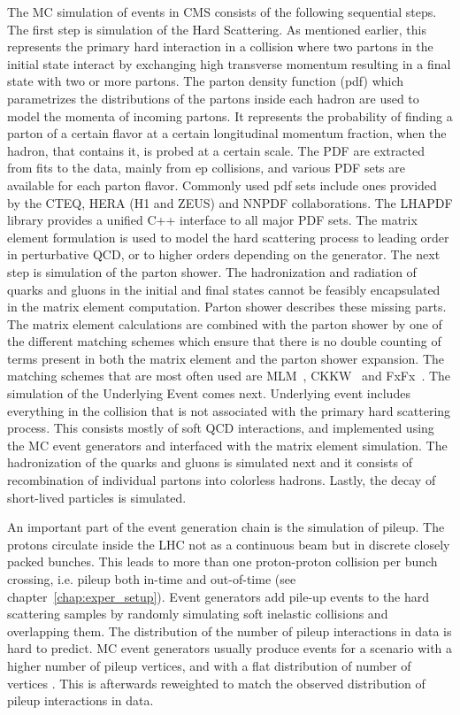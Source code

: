 The MC simulation of events in CMS consists of the following sequential steps. The first step is simulation of the Hard Scattering. As mentioned earlier, this represents the primary hard interaction in a collision where two partons in the initial state interact by exchanging high transverse momentum resulting in a final state with two or more partons. The parton density function (pdf) which parametrizes the distributions of the partons inside each hadron are used to model the momenta of incoming partons. It represents the probability of finding a parton of a certain flavor at a certain longitudinal momentum fraction, when the hadron, that contains it, is probed at a certain scale. The PDF are extracted from fits to the data, mainly from ep collisions, and various PDF sets are available for each parton flavor. Commonly used pdf sets include ones provided by the  CTEQ, HERA (H1 and ZEUS) and NNPDF collaborations. The LHAPDF library provides a unified C++ interface to all major PDF sets. The matrix element formulation is used to model the hard scattering process to leading order in perturbative QCD, or to higher orders depending on the generator. The next step is simulation of the parton shower. The hadronization and radiation of quarks and gluons in the initial and final states cannot be feasibly encapsulated in the matrix element computation. Parton shower describes these missing parts. The matrix element calculations are combined with the parton shower by one of the different matching schemes which ensure that there is no double counting of terms present in both the matrix element and the parton shower expansion. The matching schemes that are most often used are MLM~\cite{mlm}, CKKW~\cite{ckkw} and FxFx~\cite{Frederix:2012ps}. The simulation of the Underlying Event comes next. Underlying event includes everything in the collision that is not associated with the primary hard scattering process. This consists mostly of soft QCD interactions, and implemented using the MC event generators and interfaced with the matrix element simulation. The hadronization of the quarks and gluons is simulated next and it consists of recombination of individual partons into colorless hadrons. Lastly, the decay of short-lived particles is simulated.

An important part of the event generation chain is the simulation of pileup. The protons circulate inside the LHC not as a continuous beam but in discrete closely packed bunches. This leads to more than one proton-proton collision per bunch crossing, i.e. pileup both in-time and out-of-time (see chapter~\ref{chap:exper_setup}). Event generators add  pile-up events to the hard scattering samples by randomly simulating soft inelastic collisions and overlapping them. The distribution of the number of pileup interactions in data is hard to predict. MC event generators usually produce events for a scenario with a higher number of pileup vertices, and with a flat distribution of number of vertices . This is afterwards reweighted to match the observed distribution of pileup interactions in data.

